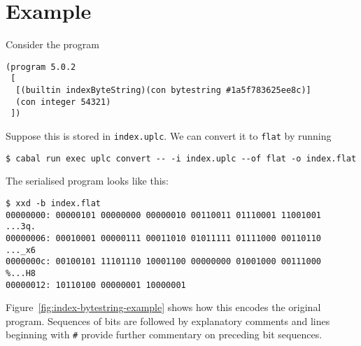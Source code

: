 
\section{Example}
Consider the program
\begin{verbatim}
(program 5.0.2
 [
  [(builtin indexByteString)(con bytestring #1a5f783625ee8c)]
  (con integer 54321)
 ])
\end{verbatim}

\noindent Suppose this is stored in \texttt{index.uplc}.  We can convert it to
\texttt{flat} by running
\begin{verbatim}
$ cabal run exec uplc convert -- -i index.uplc --of flat -o index.flat
\end{verbatim}

\noindent The serialised program looks like this:

{\small
\begin{verbatim}
$ xxd -b index.flat
00000000: 00000101 00000000 00000010 00110011 01110001 11001001  ...3q.
00000006: 00010001 00000111 00011010 01011111 01111000 00110110  ..._x6
0000000c: 00100101 11101110 10001100 00000000 01001000 00111000  %...H8
00000012: 10110100 00000001 10000001
\end{verbatim}
}

\noindent Figure~\ref{fig:index-bytestring-example} shows how this encodes the
original program.  Sequences of bits are followed by explanatory comments and
lines beginning with \texttt{\#} provide further commentary on preceding bit
sequences.

\newcommand{\arrow}{$\rightarrow$}


